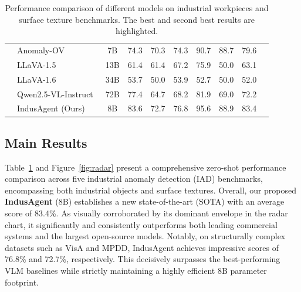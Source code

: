 \documentclass{llmxive}
\begin{document}
\begin{table}[t]
{\begin{tabular}{l|lc|ccc|ccc|c}
& Anomaly-OV~\citep{xu2025towards} & 7B & 74.3 & \cellcolor{best}70.3 &\cellcolor{best} 74.3  & \cellcolor{best}90.7 & \cellcolor{best}88.7 & 79.6 \\
& LLaVA-1.5~\citep{liu2023llava15} & 13B & 61.4 & 61.4 & 67.2 & 75.9 & 50.0 & 63.1 \\
& LLaVA-1.6~\citep{liu2024llavanext} & 34B & 53.7 & 50.0 & 53.9  & 52.7 & 50.0 & 52.0 \\
& Qwen2.5-VL-Instruct~\cite{Qwen2.5-VL} & 72B & 77.4\cellcolor{best} & 64.7 & 68.2  & 81.9 & 69.0 & 72.2 \\
\midrule
\multirow{1}{*}{}
& IndusAgent (Ours) & 8B &\cellcolor{best2} 83.6 &\cellcolor{best2} 72.7 & \cellcolor{best2}76.8 & \cellcolor{best2}95.6 & \cellcolor{best2}88.9 & 83.4 \\
\bottomrule
\end{tabular}
}
\caption{Performance comparison of different models on industrial workpieces and surface texture benchmarks. The \colorbox{best2}{best} and \colorbox{best}{second best} results are highlighted.}
\label{model_comparison}
\end{table}


\subsection{Main Results}


Table~\ref{model_comparison} and Figure~\ref{fig:radar} present a comprehensive zero-shot performance comparison across five industrial anomaly detection (IAD) benchmarks, encompassing both industrial objects and surface textures. Overall, our proposed \textbf{IndusAgent} (8B) establishes a new state-of-the-art (SOTA) with an average score of 83.4\%. As visually corroborated by its dominant envelope in the radar chart, it significantly and consistently outperforms both leading commercial systems and the largest open-source models. Notably, on structurally complex datasets such as VisA and MPDD, IndusAgent achieves impressive scores of 76.8\% and 72.7\%, respectively. This decisively surpasses the best-performing VLM baselines while strictly maintaining a highly efficient 8B parameter footprint. 

\end{document}
